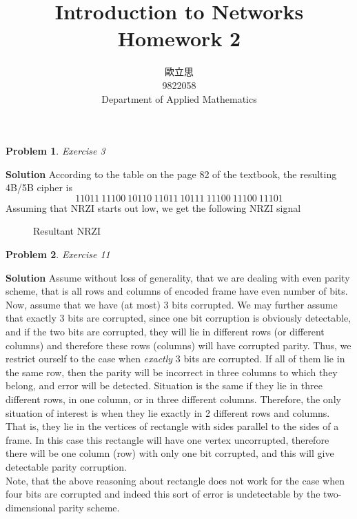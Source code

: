 \documentclass[11pt]{article} %
\title{Introduction to Networks\\Homework 2}
\author{歐立思\\
9822058\\Department of Applied Mathematics}
\newtheorem{prob}{Problem}
\newenvironment{solution}%
{\par\textbf{Solution}\space }%
{\par}
\begin{document}
\begin{CJK}{UTF8}{bsmi}
\maketitle
\end{CJK}
\begin{prob}
	Exercise 3%
\end{prob}
\begin{solution}
According to the table on the page 82 of the textbook, the resulting 4B/5B cipher is
\[11011\:11100\:10110\:11011\:10111\:11100\:11100\:11101\]
Assuming that NRZI starts out low, we get the following NRZI signal
\begin{figure}[H]
\centering
{}
\caption{Resultant NRZI}
\end{figure}
\end{solution}
\begin{prob}
	Exercise 11
\end{prob}
\begin{solution}
	Assume without loss of generality, that we are dealing with even parity scheme, that is all rows and columns of encoded frame have
	even number of bits. Now, assume that we have (at most) 3 bits corrupted. We may further assume that exactly 3 bits are corrupted,
	since one bit corruption is obviously detectable, and if the two bits are corrupted, they will lie in different rows (or different columns)
	and therefore these rows (columns) will have corrupted parity. Thus, we restrict ourself to the case when \textit{exactly} 3 bits are
	corrupted. If all of them lie in the same row, then the parity will be
	incorrect in three columns to which they belong, and error will be detected. Situation is the same if they lie in three different rows,
	in one column, or in three different columns. Therefore, the only situation of interest is when they lie exactly in 2 different rows
	and columns. That is, they lie in the vertices of rectangle with sides parallel to the sides of a frame. In this case this rectangle will
	have one vertex uncorrupted, therefore there will be one column (row) with only one bit corrupted, and this will give detectable parity
	corruption.\\
	Note, that the above reasoning about rectangle
	does not work for the case when four bits are corrupted and indeed this sort of error is undetectable by
	the two-dimensional parity scheme.
\end{solution}
\end{document}
